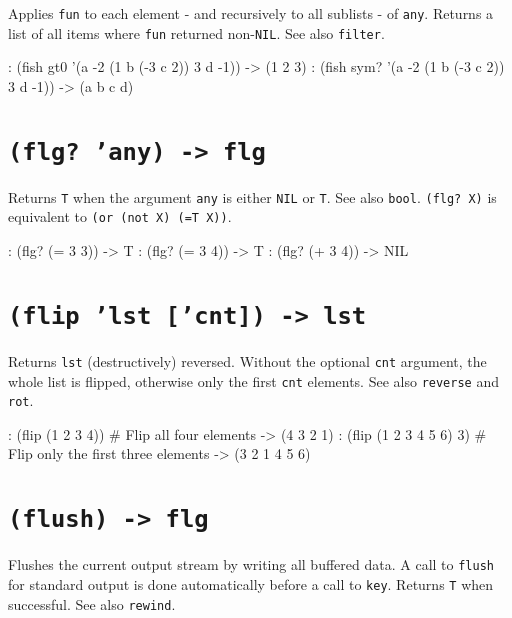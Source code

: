 Applies \texttt{fun} to each element - and recursively to all sublists - of
\texttt{any}. Returns a list of all items where \texttt{fun} returned non-\texttt{NIL}. See
also \texttt{filter}.


\begin{wideverbatim}
: (fish gt0 '(a -2 (1 b (-3 c 2)) 3 d -1))
-> (1 2 3)
: (fish sym? '(a -2 (1 b (-3 c 2)) 3 d -1))
-> (a b c d)
\end{wideverbatim}

 
\section*{\texttt{(flg? 'any) -> flg}}
\label{sec:func-ref-F-(flg? 'any) -> flg}


Returns \texttt{T} when the argument \texttt{any} is either \texttt{NIL} or \texttt{T}. See also
\texttt{bool}. \texttt{(flg? X)} is equivalent to \texttt{(or (not X) (=T X))}.


\begin{wideverbatim}
: (flg? (= 3 3))
-> T
: (flg? (= 3 4))
-> T
: (flg? (+ 3 4))
-> NIL
\end{wideverbatim}

 
\section*{\texttt{(flip 'lst ['cnt]) -> lst}}
\label{sec:func-ref-F-(flip 'lst ['cnt]) -> lst}


Returns \texttt{lst} (destructively) reversed. Without the optional \texttt{cnt}
argument, the whole list is flipped, otherwise only the first \texttt{cnt}
elements. See also \texttt{reverse} and \texttt{rot}.


\begin{wideverbatim}
: (flip (1 2 3 4))         # Flip all  four elements
-> (4 3 2 1)
: (flip (1 2 3 4 5 6) 3)   # Flip only the first three elements
-> (3 2 1 4 5 6)
\end{wideverbatim}

 
\section*{\texttt{(flush) -> flg}}
\label{sec:func-ref-F-(flush) -> flg}


Flushes the current output stream by writing all buffered data. A call
to \texttt{flush} for standard output is done automatically before a call to
\texttt{key}. Returns \texttt{T} when successful. See also \texttt{rewind}.



